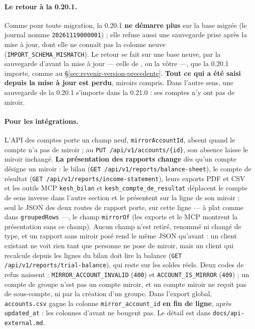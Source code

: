 \documentclass[a4paper,11pt,oneside]{article}
\begin{document}
\paragraph{Le retour à la 0.20.1.} Comme pour toute migration, la 0.20.1 \textbf{ne démarre plus} sur la base migrée (le journal nomme \texttt{20261119000001}) ; elle refuse aussi une sauvegarde prise après la mise à jour, dont elle ne connaît pas la colonne neuve (\texttt{IMPORT\_SCHEMA\_MISMATCH}). Le retour se fait sur une base neuve, par la sauvegarde d'avant la mise à jour --- celle de , ou la vôtre ---, que la 0.20.1 importe, comme au \S\ref{sec:revenir-version-precedente}. \textbf{Tout ce qui a été saisi depuis la mise à jour est perdu}, miroirs compris. Dans l'autre sens, une sauvegarde de la 0.20.1 s'importe dans la 0.21.0 : ses comptes n'y ont pas de miroir.

\paragraph{Pour les intégrations.} L'API des comptes porte un champ neuf, \texttt{mirrorAccountId}, absent quand le compte n'a pas de miroir ; au \texttt{PUT /api/v1/accounts/\{id\}}, son absence laisse le miroir inchangé. \textbf{La présentation des rapports change} dès qu'un compte désigne un miroir : le bilan (\texttt{GET /api/v1/reports/balance-sheet}), le compte de résultat (\texttt{GET /api/v1/reports/income-statement}), leurs exports PDF et CSV et les outils MCP \texttt{kesh\_bilan} et \texttt{kesh\_compte\_de\_resultat} déplacent le compte de sens inverse dans l'autre section et le présentent sur la ligne de son miroir ; seul le JSON des deux routes de rapport porte, sur cette ligne --- à plat comme dans \texttt{groupedRows} ---, le champ \texttt{mirrorOf} (les exports et le MCP montrent la présentation sans ce champ). Aucun champ n'est retiré, renommé ni changé de type, et un rapport sans miroir posé rend le même JSON qu'avant : un client existant ne voit rien tant que personne ne pose de miroir, mais un client qui recalcule depuis les lignes du bilan doit lire la balance (\texttt{GET /api/v1/reports/trial-balance}), qui reste sur les soldes réels. Deux codes de refus naissent : \texttt{MIRROR\_ACCOUNT\_INVALID} (\texttt{400}) et \texttt{ACCOUNT\_IS\_MIRROR} (\texttt{409}) ; un compte de groupe n'est pas un compte miroir, et un compte miroir ne reçoit pas de sous-compte, ni par la création d'un groupe. Dans l'export global, \texttt{accounts.csv} gagne la colonne \texttt{mirror\_account\_id} \textbf{en fin de ligne}, après \texttt{updated\_at} : les colonnes d'avant ne bougent pas. Le détail est dans \texttt{docs/api-external.md}.
\end{document}
